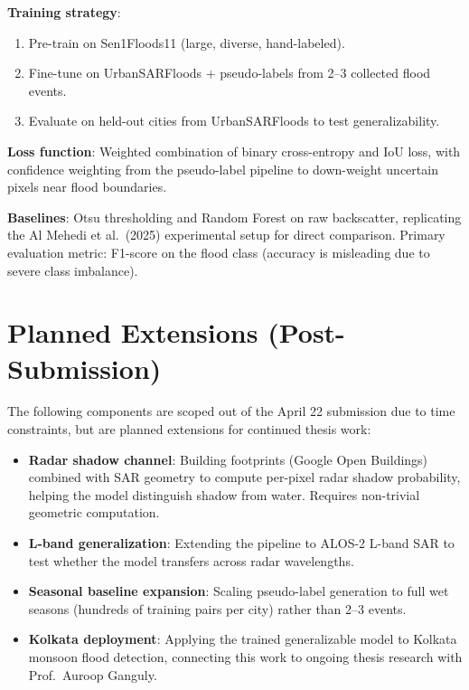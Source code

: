 \documentclass[11pt]{article}
\begin{document}
\textbf{Training strategy}:
\begin{enumerate}[noitemsep]
    \item Pre-train on Sen1Floods11 (large, diverse, hand-labeled).
    \item Fine-tune on UrbanSARFloods + pseudo-labels from 2--3 collected flood events.
    \item Evaluate on held-out cities from UrbanSARFloods to test generalizability.
\end{enumerate}

\textbf{Loss function}: Weighted combination of binary cross-entropy and IoU loss,
with confidence weighting from the pseudo-label pipeline to down-weight uncertain
pixels near flood boundaries.

\textbf{Baselines}: Otsu thresholding and Random Forest on raw backscatter, replicating
the Al Mehedi et al.\ (2025) experimental setup for direct comparison. Primary
evaluation metric: F1-score on the flood class (accuracy is misleading due to severe
class imbalance).

\section*{Planned Extensions (Post-Submission)}

The following components are scoped out of the April 22 submission due to time
constraints, but are planned extensions for continued thesis work:

\begin{itemize}[noitemsep]
    \item \textbf{Radar shadow channel}: Building footprints (Google Open Buildings)
    combined with SAR geometry to compute per-pixel radar shadow probability, helping
    the model distinguish shadow from water. Requires non-trivial geometric computation.
    \item \textbf{L-band generalization}: Extending the pipeline to ALOS-2 L-band SAR
    to test whether the model transfers across radar wavelengths.
    \item \textbf{Seasonal baseline expansion}: Scaling pseudo-label generation to
    full wet seasons (hundreds of training pairs per city) rather than 2--3 events.
    \item \textbf{Kolkata deployment}: Applying the trained generalizable model to
    Kolkata monsoon flood detection, connecting this work to ongoing thesis research
    with Prof.\ Auroop Ganguly.
\end{itemize}
\end{document}
